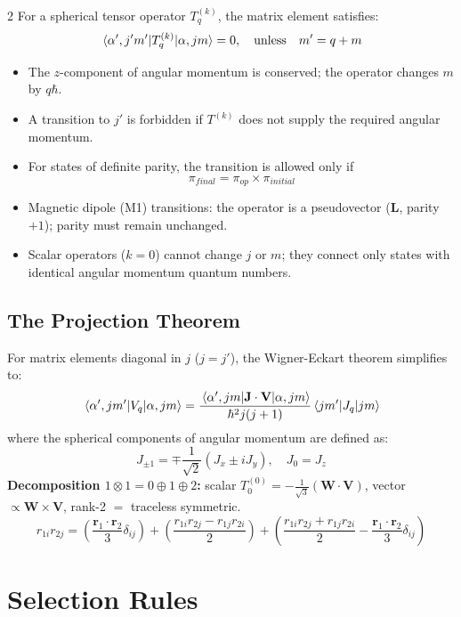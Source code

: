 \documentclass[9pt,a4paper]{article} %
\newcommand{\bs}[1]{\symbf{#1}}\usepackage{empheq}   %
\begin{document}
\begin{multicols}{2}
For a spherical tensor operator $T_q^{(k)}$, the matrix element satisfies:
\begin{equation*}
    \mel{\alpha', j'm'}{T_q^{(k)}}{\alpha, jm} = 0, \quad \text{unless} \quad m' = q + m
\end{equation*}
\begin{itemize}
    \item The $z$-component of angular momentum is conserved; the operator changes $m$ by $q\hbar$.
    \item A transition to $j'$ is forbidden if $T^{(k)}$ does not supply the required angular momentum.
    \item For states of definite parity, the transition is allowed only if
    \[
    \pi_{final} = \pi_{op} \times \pi_{initial}
    \]
    \item Magnetic dipole (M1) transitions: the operator is a pseudovector ($\mathbf{L}$, parity $+1$); parity must remain unchanged.
    \item Scalar operators ($k=0$) cannot change $j$ or $m$; they connect only states with identical angular momentum quantum numbers.
\end{itemize}

\subsection{The Projection Theorem}
For matrix elements diagonal in $j$ ($j=j'$), the Wigner-Eckart theorem simplifies to:
\begin{equation*}
    \mel{\alpha', j m'}{V_q}{\alpha, j m} = \frac{\mel{\alpha', j m}{\mathbf{J} \cdot \mathbf{V}}{\alpha, j m}}{\hbar^2 j(j+1)} \mel{j m'}{J_q}{j m}
\end{equation*}
where the spherical components of angular momentum are defined as:
\begin{equation*}
    J_{\pm 1} = \mp \frac{1}{\sqrt{2}}(J_x \pm i J_y), \quad J_0 = J_z
\end{equation*}
{\footnotesize
\textbf{Decomposition $1\otimes 1=0\oplus 1\oplus 2$:}\;
scalar $T^{(0)}_0=-\frac{1}{\sqrt{3}}(\mathbf{W}\cdot\mathbf{V})$,
vector $\propto \mathbf{W}\times\mathbf{V}$, rank-2 $=$ traceless symmetric.
}
\[r_{1i}r_{2j} = \left( \frac{\bs{r}_1 \cdot \bs{r}_2}{3} \delta_{ij} \right) + \left( \frac{r_{1i}r_{2j} - r_{1j}r_{2i}}{2} \right) + \left( \frac{r_{1i}r_{2j} + r_{1j}r_{2i}}{2} - \frac{\bs{r}_1 \cdot \bs{r}_2}{3} \delta_{ij} \right)\]

\section{Selection Rules}


\end{multicols}
\end{document}
